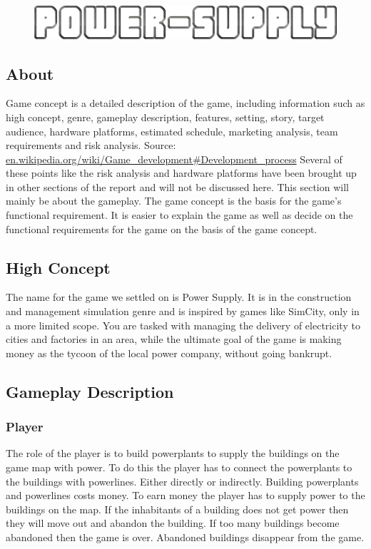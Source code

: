 \begin{figure}[H]
	\includegraphics[scale=0.40]{pictures/logo2.png}
\end{figure}

\subsection{About}
Game concept is a detailed description of the game, including information such as high concept, genre,
gameplay description, features, setting, story, target audience, hardware platforms, estimated schedule,
marketing analysis, team requirements and risk analysis. Source: 
\url{en.wikipedia.org/wiki/Game_development#Development_process}
Several of these points like the risk analysis and hardware platforms have been brought up in other 
sections of the report and will not be discussed here. This section will mainly be about the gameplay. 
The game concept is the basis for the game's functional requirement. It is easier to explain the game 
as well as decide on the functional requirements for the game on the basis of the game concept. 

\subsection{High Concept}
The name for the game we settled on is Power Supply. It is in the construction and management 
simulation genre and is inspired by games like SimCity, only in a more limited scope. You are 
tasked with managing the delivery of electricity to cities and factories in an area, while the 
ultimate goal of the game is making money as the tycoon of the local power company, without going 
bankrupt.

\subsection{Gameplay Description}

\subsubsection*{Player}
The role of the player is to build powerplants to supply the buildings on the game map with power. 
To do this the player has to connect the powerplants to the buildings with powerlines. Either directly
or indirectly. Building powerplants and powerlines costs money. To earn money the player has to supply
power to the buildings on the map. If the inhabitants of a building does not get power then they will
move out and abandon the building. If too many buildings become abandoned then the game is over.
Abandoned buildings disappear from the game.

